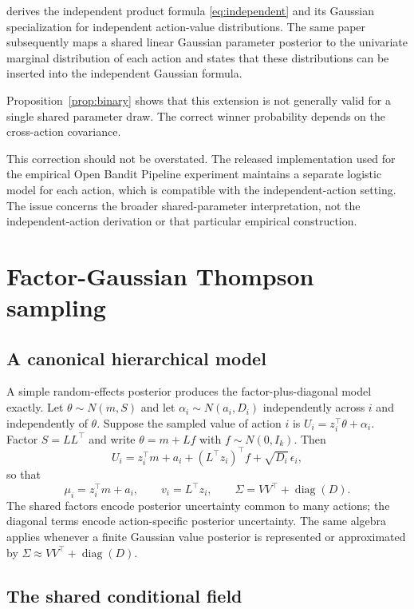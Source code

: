 \documentclass[11pt]{article}
\begin{document}
\textcite{jeunen2025} derives the independent product formula \eqref{eq:independent} and its Gaussian specialization for independent action-value distributions. The same paper subsequently maps a shared linear Gaussian parameter posterior to the univariate marginal distribution of each action and states that these distributions can be inserted into the independent Gaussian formula.

Proposition~\ref{prop:binary} shows that this extension is not generally valid for a single shared parameter draw. The correct winner probability depends on the cross-action covariance.

This correction should not be overstated. The released implementation used for the empirical Open Bandit Pipeline experiment maintains a separate logistic model for each action, which is compatible with the independent-action setting. The issue concerns the broader shared-parameter interpretation, not the independent-action derivation or that particular empirical construction.

\section{Factor-Gaussian Thompson sampling}
\label{sec:factor}

\subsection{A canonical hierarchical model}

A simple random-effects posterior produces the factor-plus-diagonal model exactly. Let $\theta \sim N(m, S)$ and let $\alpha_i \sim N(a_i, D_i)$ independently across $i$ and independently of $\theta$. Suppose the sampled value of action $i$ is $U_i = z_i^\top \theta + \alpha_i$. Factor $S = L L^\top$ and write $\theta = m + L f$ with $f \sim N(0, I_k)$. Then
\[
U_i
=
z_i^\top m + a_i
+
(L^\top z_i)^\top f
+
\sqrt{D_i}\,\epsilon_i,
\]
so that
\[
\mu_i = z_i^\top m + a_i,
\qquad
v_i = L^\top z_i,
\qquad
\Sigma = V V^\top + \operatorname{diag}(D).
\]
The shared factors encode posterior uncertainty common to many actions; the diagonal terms encode action-specific posterior uncertainty. The same algebra applies whenever a finite Gaussian value posterior is represented or approximated by $\Sigma \approx V V^\top + \operatorname{diag}(D)$.

\subsection{The shared conditional field}
\end{document}
